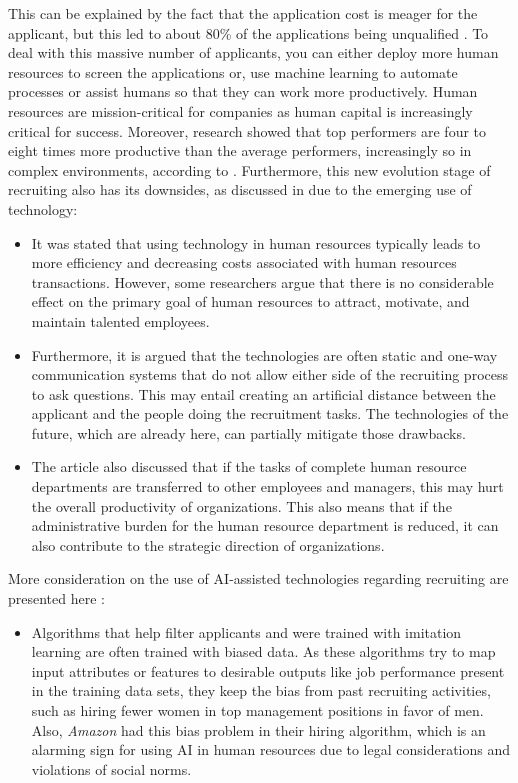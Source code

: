 \documentclass[draft,final]{thesisclass} %
\begin{document}
\begin{enumerate}
    This can be explained by the fact that the application cost is meager for the applicant, but this led to about 80\% of the applications being unqualified \parencite[4]{ai_recruiting}.
    To deal with this massive number of applicants, you can either deploy more human resources to screen the applications or, use machine learning to automate processes or assist humans so that they can work more productively.
    Human resources are mission-critical for companies as human capital is increasingly critical for success.
    Moreover, research showed that top performers are four to eight times more productive than the average performers, increasingly so in complex environments, according to \textcite[4]{ai_recruiting}.
    Furthermore, this new evolution stage of recruiting also has its downsides, as discussed in \textcite[4-5]{challenges_opportunities_hr} due to the emerging use of technology:
    \begin{itemize}
        \item It was stated that using technology in human resources typically leads to more efficiency and decreasing costs associated with human resources transactions. However, some researchers argue that there is no considerable effect on the primary goal of human resources to attract, motivate, and maintain talented employees. 
        \item Furthermore, it is argued that the technologies are often static and one-way communication systems that do not allow either side of the recruiting process to ask questions. This may entail creating an artificial distance between the applicant and the people doing the recruitment tasks. The technologies of the future, which are already here, can partially mitigate those drawbacks.
        \item The article also discussed that if the tasks of complete human resource departments are transferred to other employees and managers, this may hurt the overall productivity of organizations. This also means that if the administrative burden for the human resource department is reduced, it can also contribute to the strategic direction of organizations.
    \end{itemize}
    More consideration on the use of \acs{AI}-assisted technologies regarding recruiting are presented here \parencite[2-4]{ai_in_hr_management}:
    \begin{itemize}
        \item Algorithms that help filter applicants and were trained with imitation learning are often trained with biased data. As these algorithms try to map input attributes or features to desirable outputs like job performance present in the training data sets, they keep the bias from past recruiting activities, such as hiring fewer women in top management positions in favor of men. Also, \textit{Amazon} had this bias problem in their hiring algorithm, which is an alarming sign for using \acs{AI} in human resources due to legal considerations and violations of social norms.

\end{itemize}
\end{enumerate}
\end{document}

